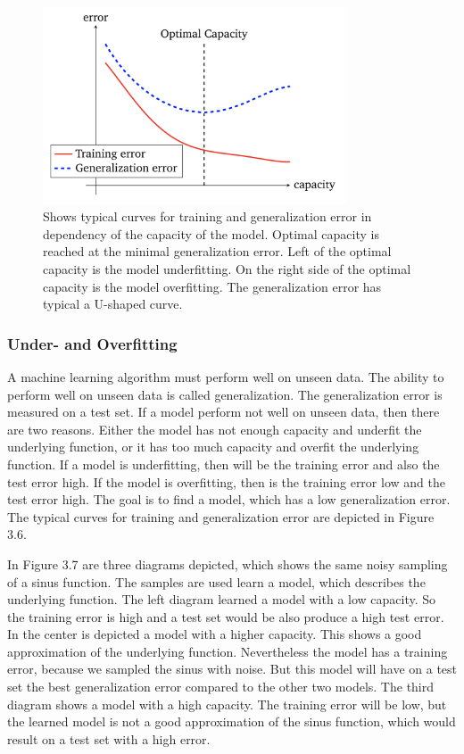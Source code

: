 \begin{figure}[h]
	\centering
	\includegraphics[width=0.8\textwidth]{Figures/Section3_Generalization}
	\caption{Shows typical curves for training and generalization error in dependency of the capacity of the model. Optimal capacity is reached at the minimal generalization error. Left of the optimal capacity is the model underfitting. On the right side of the optimal capacity is the model overfitting. The generalization error has typical a U-shaped curve.}
	\label{fig:  Generalization}
\end{figure}

\subsubsection*{Under- and Overfitting}
A machine learning algorithm must perform well on unseen data. The ability to perform well on unseen data is called generalization. The generalization error is measured on a test set. If a model perform not well on unseen data, then there are two reasons. Either the model has not enough capacity and underfit the underlying function, or it has too much capacity and overfit the underlying function. If a model is underfitting, then will be the training error and also the test error high. If the model is overfitting, then is the training error low and the test error high. The goal is to find a model, which has a low generalization error. The typical curves for training and generalization error are depicted in Figure 3.6.

In Figure 3.7 are three diagrams depicted, which shows the same noisy sampling of a sinus function. The samples are used learn a model, which describes the underlying function. The left diagram learned a model with a low capacity. So the training error is high and a test set would be also produce a high test error. In the center is depicted a model with a higher capacity. This shows a good approximation of the underlying function. Nevertheless the model has a training error, because we sampled the sinus with noise. But this model will have on a test set the best generalization error compared to the other two models. The third diagram shows a model with a high capacity. The training error will be low, but the learned model is not a good approximation of the sinus function, which would result on a test set with a high error.

